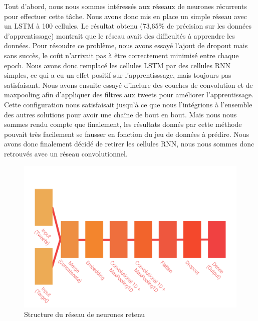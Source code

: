 \par Tout d'abord, nous nous sommes intéressés aux réseaux de neurones récurrents pour effectuer cette tâche. Nous avons donc mis en place un simple réseau avec un LSTM à 100 cellules. Le résultat obtenu (73,65\% de précision sur les données d'apprentissage) montrait que le réseau avait des difficultés à apprendre les données. Pour résoudre ce problème, nous avons essayé l'ajout de dropout mais sans succès, le coût n'arrivait pas à être correctement minimisé entre chaque epoch. Nous avons donc remplacé les cellules LSTM par des cellules RNN simples, ce qui a eu un effet positif sur l'apprentisssage, mais toujours pas satisfaisant. Nous avons ensuite essayé d'inclure des couches de convolution et de maxpooling afin d'appliquer des filtres aux tweets pour améliorer l'apprentissage. Cette configuration nous satisfaisait jusqu'à ce que nous l'intégrions à l'ensemble des autres solutions pour avoir une chaîne de bout en bout. Mais nous nous sommes rendu compte que finalement, les résultats donnés par cette méthode pouvait très facilement se fausser en fonction du jeu de données à prédire. Nous avons donc finalement décidé de retirer les cellules RNN, nous nous sommes donc retrouvés avec un réseau convolutionnel.
\par\leavevmode\par  
\par\leavevmode\par
\par\leavevmode\par  
\par\leavevmode\par  
\par\leavevmode\par
\par\leavevmode\par 
\par\leavevmode\par  
\par\leavevmode\par
\par\leavevmode\par 

\begin{figure}
	\centering
	\includegraphics[scale=1.5]{./img/nn.png}
	\caption{Structure du réseau de neurones retenu}
	\label{fig:nn}
\end{figure}

